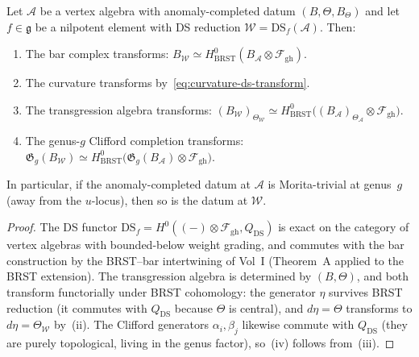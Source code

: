 \begin{theorem}
Let $\mathcal A$ be a vertex algebra with anomaly-completed
datum $(B,\Theta,B_\Theta)$ and let $f\in\mathfrak g$ be a
nilpotent element with DS reduction
$\mathcal W=\mathrm{DS}_f(\mathcal A)$. Then:
\begin{enumerate}[label=\textup{(\roman*)}]
\item The bar complex transforms:
 $B_{\mathcal W}\simeq H^0_{\mathrm{BRST}}
 (B_{\mathcal A}\otimes\mathcal F_{\mathrm{gh}})$.
\item The curvature transforms by~\eqref{eq:curvature-ds-transform}.
\item The transgression algebra transforms:
 $(B_{\mathcal W})_{\Theta_{\mathcal W}}
 \simeq
 H^0_{\mathrm{BRST}}\bigl(
 (B_{\mathcal A})_{\Theta_{\mathcal A}}
 \otimes\mathcal F_{\mathrm{gh}}
 \bigr)$.
\item The genus-$g$ Clifford completion transforms:
 $\mathfrak G_g(B_{\mathcal W})
 \simeq
 H^0_{\mathrm{BRST}}\bigl(
 \mathfrak G_g(B_{\mathcal A})
 \otimes\mathcal F_{\mathrm{gh}}
 \bigr)$.
\end{enumerate}
In particular, if the anomaly-completed datum at
$\mathcal A$ is Morita-trivial at genus~$g$ (away from the
$u$-locus), then so is the datum at $\mathcal W$.
\end{theorem}

\begin{proof}
The DS functor $\mathrm{DS}_f=H^0((-)\otimes
\mathcal F_{\mathrm{gh}},Q_{\mathrm{DS}})$ is exact on the
category of vertex algebras with bounded-below weight grading,
and commutes with the bar construction by the BRST--bar
intertwining of Vol~I (Theorem~A applied to the BRST
extension). The transgression algebra is determined by
$(B,\Theta)$, and both transform functorially under BRST
cohomology: the generator $\eta$ survives BRST reduction
(it commutes with $Q_{\mathrm{DS}}$ because $\Theta$ is
central), and $d\eta=\Theta$ transforms to
$d\eta=\Theta_{\mathcal W}$ by~(ii). The Clifford generators
$\alpha_i,\beta_j$ likewise commute with $Q_{\mathrm{DS}}$
(they are purely topological, living in the genus factor),
so~(iv) follows from~(iii).
\end{proof}

